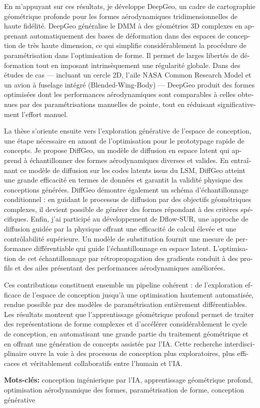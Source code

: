 \begin{otherlanguage}{french}
En m’appuyant sur ces résultats, je développe DeepGeo, un cadre de cartographie géométrique profonde pour les formes aérodynamiques tridimensionnelles de haute fidélité. DeepGeo généralise le DMM à des géométries 3D complexes en apprenant automatiquement des bases de déformation dans des espaces de conception de très haute dimension, ce qui simplifie considérablement la procédure de paramétrisation dans l’optimisation de forme. Il permet de larges libertés de déformation tout en imposant intrinsèquement une régularité globale. Dans des études de cas — incluant un cercle 2D, l’aile NASA Common Research Model et un avion à fuselage intégré (Blended-Wing-Body) — DeepGeo produit des formes optimisées dont les performances aérodynamiques sont comparables à celles obtenues par des paramétrisations manuelles de pointe, tout en réduisant significativement l’effort manuel.

La thèse s’oriente ensuite vers l’exploration générative de l’espace de conception, une étape nécessaire en amont de l’optimisation pour le prototypage rapide de concepts. Je propose DiffGeo, un modèle de diffusion en espace latent qui apprend à échantillonner des formes aérodynamiques diverses et valides. En entraînant ce modèle de diffusion sur les codes latents issus du LSM, DiffGeo atteint une grande efficacité en termes de données et garantit la validité physique des conceptions générées. DiffGeo démontre également un schéma d’échantillonnage conditionnel : en guidant le processus de diffusion par des objectifs géométriques complexes, il devient possible de générer des formes répondant à des critères spécifiques. Enfin, j’ai participé au développement de Dflow-SUR, une approche de diffusion guidée par la physique offrant une efficacité de calcul élevée et une contrôlabilité supérieure. Un modèle de substitution fournit une mesure de performance différentiable qui guide l’échantillonnage en espace latent. L’optimisation de cet échantillonnage par rétropropagation des gradients conduit à des profils et des ailes présentant des performances aérodynamiques améliorées.

Ces contributions constituent ensemble un pipeline cohérent : de l’exploration efficace de l’espace de conception jusqu’à une optimisation hautement automatisée, rendue possible par des modèles de paramétrisation entièrement différentiables. Les résultats montrent que l’apprentissage géométrique profond permet de traiter des représentations de forme complexes et d’accélérer considérablement le cycle de conception, en automatisant une grande partie du traitement géométrique et en offrant une génération de concepts assistée par l’IA. Cette recherche interdisciplinaire ouvre la voie à des processus de conception plus exploratoires, plus efficaces et véritablement collaboratifs entre l’humain et l’IA.

\textbf{Mots-clés:} conception ingénierique par l’IA, apprentissage géométrique profond, optimisation aérodynamique des formes, paramétrisation de forme, conception générative

\end{otherlanguage}



